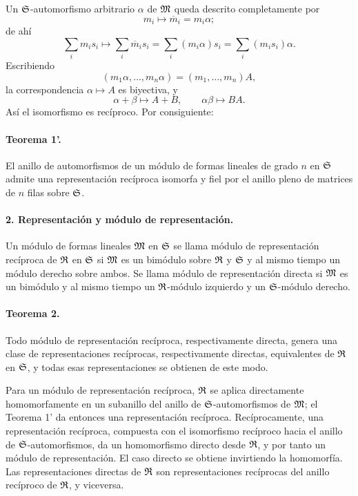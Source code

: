 Un \(\mathfrak S\)-automorfismo arbitrario \(\alpha\) de \(\mathfrak M\) queda descrito completamente por
\[
        m_i\longmapsto \overline m_i=m_i\alpha;
\]
de ahí
\[
        \sum_i m_i s_i\longmapsto
        \sum_i \overline m_i s_i
        =\sum_i (m_i\alpha)s_i
        =\sum_i (m_i s_i)\alpha.
\]
Escribiendo
\[
        (m_1\alpha,\ldots,m_n\alpha)=(m_1,\ldots,m_n)A,
\]
la correspondencia \(\alpha\mapsto A\) es biyectiva, y
\[
        \alpha+\beta\mapsto A+B,\qquad
        \alpha\beta\mapsto BA.
\]
Así el isomorfismo es recíproco. Por consiguiente:

\paragraph{Teorema 1'.}
El anillo de automorfismos de un módulo de formas lineales de grado \(n\) en \(\mathfrak S\) admite una representación recíproca isomorfa y fiel por el anillo pleno de matrices de \(n\) filas sobre \(\mathfrak S\).

\paragraph{2. Representación y módulo de representación.}
Un módulo de formas lineales \(\mathfrak M\) en \(\mathfrak S\) se llama módulo de representación recíproca de \(\mathfrak R\) en \(\mathfrak S\) si \(\mathfrak M\) es un bimódulo sobre \(\mathfrak R\) y \(\mathfrak S\) y al mismo tiempo un módulo derecho sobre ambos. Se llama módulo de representación directa si \(\mathfrak M\) es un bimódulo y al mismo tiempo un \(\mathfrak R\)-módulo izquierdo y un \(\mathfrak S\)-módulo derecho.

\paragraph{Teorema 2.}
Todo módulo de representación recíproca, respectivamente directa, genera una clase de representaciones recíprocas, respectivamente directas, equivalentes de \(\mathfrak R\) en \(\mathfrak S\), y todas esas representaciones se obtienen de este modo.

Para un módulo de representación recíproca, \(\mathfrak R\) se aplica directamente homomorfamente en un subanillo del anillo de \(\mathfrak S\)-automorfismos de \(\mathfrak M\); el Teorema 1' da entonces una representación recíproca. Recíprocamente, una representación recíproca, compuesta con el isomorfismo recíproco hacia el anillo de \(\mathfrak S\)-automorfismos, da un homomorfismo directo desde \(\mathfrak R\), y por tanto un módulo de representación. El caso directo se obtiene invirtiendo la homomorfía. Las representaciones directas de \(\mathfrak R\) son representaciones recíprocas del anillo recíproco de \(\mathfrak R\), y viceversa.

